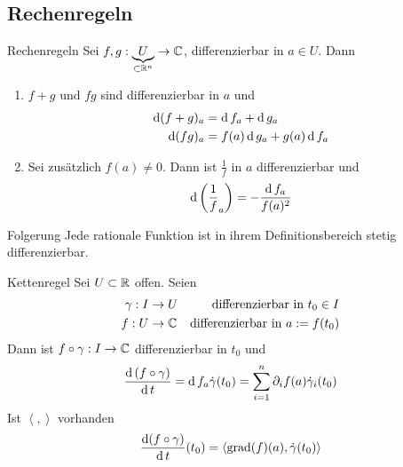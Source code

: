 \subsection{Rechenregeln}
\begin{Bem}{Rechenregeln}
  Sei $f,g:\underbrace{U}_{\subset\mathbb{R}^n}\to \mathbb{C}$, differenzierbar in $a\in U$. Dann
  \begin{enumerate}
    \item $f+g$ und $fg$ sind differenzierbar in $a$ und
      \begin{align*}
        \operatorname{d}(f+g)_a&=\operatorname{d} f_a+\operatorname{d} g_a\\
        \operatorname{d}(fg)_a&=f(a)\operatorname{d} g_a+g(a)\operatorname{d} f_a
      \end{align*}
    \item Sei zusätzlich $f(a)\neq 0$. Dann ist $\frac{1}{f}$ in $a$ differenzierbar und
      \[\operatorname{d}\left( \frac{1}{f}_a \right)=-\frac{\operatorname{d} f_a}{f(a)^2}\]
  \end{enumerate}
\end{Bem}
\begin{Bem}{Folgerung}
  Jede rationale Funktion ist in ihrem Definitionsbereich stetig differenzierbar.
\end{Bem}
\begin{Sat}{Kettenregel}
  Sei $U\subset\mathbb{R}$ offen. Seien
  \begin{align*}
    \gamma:I&\to U&\text{differenzierbar in}\ t_0\in I\\
    f:U&\to\mathbb{C}&\text{differenzierbar in}\ a:=f(t_0)
  \end{align*}
  Dann ist $f\circ \gamma:I\to\mathbb{C}$ differenzierbar in $t_0$ und
  \[\frac{\operatorname{d}\left( f\circ \gamma \right)}{\operatorname{d} t}=\operatorname{d} f_a\dot \gamma(t_0)=\sum_{i=1}^n\partial_if(a)\dot\gamma_i(t_0)\]
  Ist $\left\langle , \right\rangle$ vorhanden
  \[\frac{\operatorname{d}(f\circ \gamma)}{\operatorname{d} t}(t_0)=\left\langle \operatorname{grad}(f)(a),\dot\gamma(t_0) \right\rangle\]
\end{Sat}
